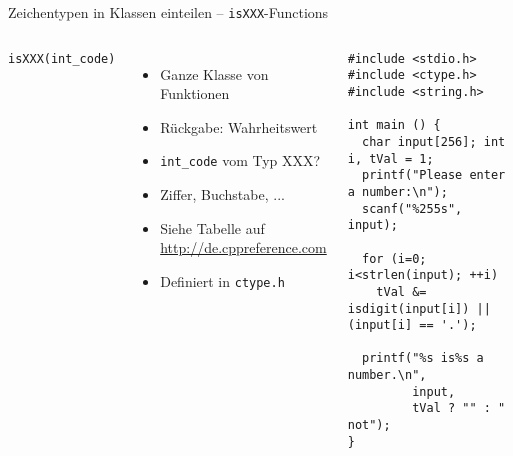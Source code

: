 \begin{frame}[fragile]{Zeichentypen in Klassen einteilen -- \texttt{isXXX}-Functions}
%
\vspace{-15pt}
\begin{columns}[T]
\begin{codebox}[Syntax]
\texttt{isXXX(int\_code)}
\end{codebox}
\begin{itemize}
\item Ganze Klasse von Funktionen
\item Rückgabe: Wahrheitswert
\item \texttt{int\_code} vom Typ XXX?
\item Ziffer, Buchstabe, ...
\item Siehe Tabelle auf\newline
	{\footnotesize\url{http://de.cppreference.com}}
\item Definiert in \texttt{ctype.h}
\end{itemize}
%
\begin{codebox}
\begin{verbatim}
#include <stdio.h>
#include <ctype.h>
#include <string.h>

int main () {
  char input[256]; int i, tVal = 1;
  printf("Please enter a number:\n");
  scanf("%255s", input);
	
  for (i=0; i<strlen(input); ++i)
    tVal &= isdigit(input[i]) || (input[i] == '.');
	
  printf("%s is%s a number.\n", 
         input, 
         tVal ? "" : " not");
}
\end{verbatim}
\end{codebox}
\end{columns}
%
\end{frame}


